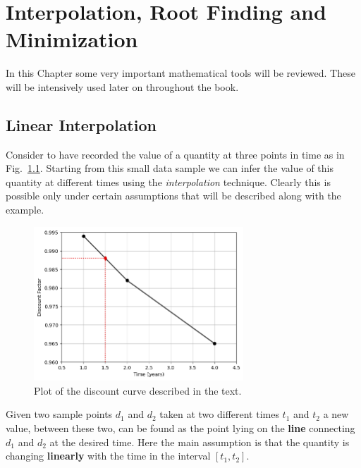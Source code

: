 \chapter{Interpolation, Root Finding and Minimization}
\label{sec:interpolation}

In this Chapter some very important mathematical tools will be reviewed. These will be intensively used later on throughout the book.

\section{Linear Interpolation}
\label{linear-interpolation}

Consider to have recorded the value of a quantity at three points in time as in Fig.~\ref{fig:samples_for_interpolation}.
Starting from this small data sample we can infer the value of this quantity at different times using the \emph{interpolation} technique. Clearly this is 
possible only under certain assumptions that will be described along with the example.

\begin{figure}[htbp]
  \centering
  \includegraphics[width=0.7\textwidth]{figures/interp_example1}
  \caption{Plot of the discount curve described in the text.}
  \label{fig:samples_for_interpolation}
\end{figure}

Given two sample points $d_1$ and $d_2$ taken at two different times $t_1$ and $t_2$ a new value, between these two, can be found as the point lying on the 
\textbf{line} connecting $d_1$ and $d_2$ at the desired time. Here the main assumption is that the quantity is changing \textbf{linearly} with the time in the
interval $[t_1, t_2]$.

